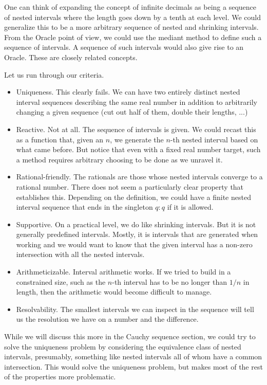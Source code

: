 \documentclass[12pt]{article}
\theoremstyle{remark}
\begin{document}
One can think of expanding the concept of infinite decimals as being a sequence of nested intervals where the length goes down by a tenth at each level. We could generalize this to be a more arbitrary sequence of nested and shrinking intervals. From the Oracle point of view, we could use the mediant method to define such a sequence of intervals. A sequence of such intervals would also give rise to an Oracle. These are closely related concepts. 

Let us run through our criteria. 

\begin{itemize}
    \item Uniqueness. This clearly fails. We can have two entirely distinct nested interval sequences describing the same real number in addition to arbitrarily changing a given sequence (cut out half of them, double their lengths, ...)
    \item Reactive. Not at all. The sequence of intervals is given. We could recast this as a function that, given an $n$, we generate the $n$-th nested interval based on what came before. But notice that even with a fixed real number target, such a method requires arbitrary choosing to be done as we unravel it.
    \item Rational-friendly. The rationals are those whose nested intervals converge to a rational number. There does not seem a particularly clear property that establishes this. Depending on the definition, we could have a finite nested interval sequence that ends in the singleton $q:q$ if it is allowed. 
    \item Supportive. On a practical level, we do like shrinking intervals. But it is not generally predefined intervals. Mostly, it is intervals that are generated when working and we would want to know that the given interval has a non-zero intersection with all the nested intervals. 
    \item Arithmeticizable. Interval arithmetic works. If we tried to build in a constrained size, such as the $n$-th interval has to be no longer than $1/n$ in length, then the arithmetic would become difficult to manage. 
    \item Resolvability. The smallest intervals we can inspect in the sequence will tell us the resolution we have on a number and the difference. 
\end{itemize}

While we will discuss this more in the Cauchy sequence section, we could try to solve the uniqueness problem by considering the equivalence class of nested intervals, presumably, something like nested intervals all of whom have a common intersection. This would solve the uniqueness problem, but makes most of the rest of the properties more problematic. 
\end{document}
